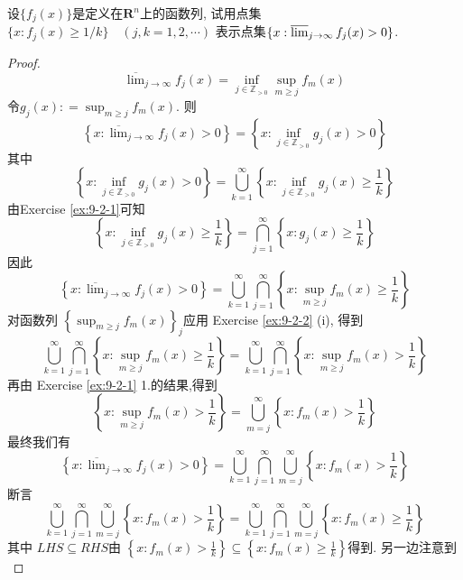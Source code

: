 \documentclass[../main.tex]{subfiles}
\begin{document}
 \begin{exercise}{}{}
设$\{f_j(x)\}$是定义在$\mathbf{R}^n$上的函数列, 试用点集 $\{x: f_j(x) \ge 1/k\} \quad (j,k = 1,2,\cdots)$ 表示点集$\{x: \varlimsup_{j\to\infty} f_j(x)>0\}$.
\end{exercise}
\begin{proof}
     \[
     \overline{\lim}_{j\to \infty}f_{j}\left( x \right)= \inf _{j\in \mathbb{Z} _{> 0}} \sup _{m\ge j}f_{m}\left( x \right)  
     \] 令\(  g_{j}\left( x \right): = \sup _{m\ge j}f_{m}\left( x \right)    \). 则\[
     \left\{ x: \overline{\lim}_{j\to \infty}f_{j}\left( x \right)> 0  \right\}= \left\{ x: \inf _{j\in \mathbb{Z} _{> 0}}g_{j}\left( x \right)> 0  \right\}
     \] 其中 \[
     \left\{ x:\inf _{j\in \mathbb{Z} _{> 0}}g_{j}\left( x \right)> 0  \right\}= \bigcup _{k= 1}^{\infty}\left\{ x: \inf _{j\in \mathbb{Z} _{> 0}}g_{j}\left( x \right)\ge \frac{1 }{k }   \right\}
     \]由Exercise \ref{ex:9-2-1}可知 \[
     \left\{ x:\inf _{j\in \mathbb{Z} _{> 0}}g_{j}\left( x \right)\ge \frac{1 }{k }   \right\}= \bigcap_{j= 1}^{\infty}\left\{ x:g_{j}\left( x \right)\ge \frac{1 }{k }   \right\} 
     \]因此 \[
     \left\{ x:\overline{\lim}_{j\to \infty}f_{j}\left( x \right)> 0  \right\}= \bigcup _{k= 1}^{\infty}\bigcap_{j= 1}^{\infty}\left\{ x: \sup _{m\ge j}f_{m}\left( x \right)\ge \frac{1 }{k }   \right\} 
     \] 对函数列 \(  \left\{ \sup _{m\ge j}f_{m}\left( x \right)  \right\}_{j}  \)应用 Exercise  \ref{ex:9-2-2} (i), 得到 \[
     \bigcup _{k= 1}^{\infty}\bigcap_{j= 1}^{\infty}\left\{ x: \sup _{m\ge j}f_{m}\left( x \right)\ge \frac{1 }{k }   \right\}= \bigcup _{k= 1}^{\infty}\bigcap_{j= 1}^{\infty}\left\{ x: \sup _{m\ge j}f_{m}\left( x \right)> \frac{1 }{k }   \right\}  
     \]再由 Exercise \ref{ex:9-2-1} 1.的结果,得到 \[
     \left\{ x:\sup _{m\ge j}f_{m}\left( x \right)> \frac{1 }{k }   \right\}= \bigcup _{m= j}^{\infty}\left\{ x:f_{m}\left( x \right)> \frac{1 }{k }   \right\}
     \]最终我们有 \[
     \left\{ x: \overline{\lim}_{j\to \infty}f_{j}\left( x \right)> 0  \right\}= \bigcup _{k= 1}^{\infty}\bigcap_{j= 1}^{\infty}\bigcup _{m= j}^{\infty}\left\{ x:f_{m}\left( x \right)> \frac{1 }{k }   \right\} 
     \]断言 \[
     \bigcup _{k= 1}^{\infty}\bigcap_{j= 1}^{\infty}\bigcup _{m= j}^{\infty}\left\{ x:f_{m}\left( x \right)> \frac{1 }{k }   \right\}=     \bigcup _{k= 1}^{\infty}\bigcap_{j= 1}^{\infty}\bigcup _{m= j}^{\infty}\left\{ x:f_{m}\left( x \right)\ge  \frac{1 }{k }   \right\}
     \]其中 \( LHS  \subseteq   RHS\)由 \(  \left\{ x:f_{m}\left( x \right)> \frac{1 }{k }   \right\}\subseteq \left\{ x:f_{m}\left( x \right)\ge \frac{1 }{k }   \right\}  \)得到.  另一边注意到 \[
\]
\end{proof}
\end{document}
